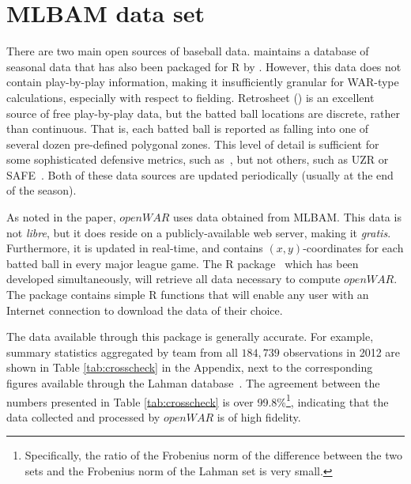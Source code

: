 \documentclass[letterpaper,titlepage]{article}
\newcommand{\R}{\textsf{R}\xspace}
\begin{document}
	

\section{MLBAM data set}
\label{apx:data}

There are two main open sources of baseball data. \cite{lahman} maintains a database of seasonal data that has also been packaged for \R by \cite{friendly}. However, this data does not contain play-by-play information, making it insufficiently granular for WAR-type calculations, especially with respect to fielding. Retrosheet (\cite{retrosheet}) is an excellent source of free play-by-play data, but the batted ball locations are discrete, rather than continuous. That is, each batted ball is reported as falling into one of several dozen pre-defined polygonal zones. This level of detail is sufficient for some sophisticated defensive metrics, such as~\cite{humphreys2011wizardry}, but not others, such as UZR or SAFE~\citep{jensen2009bayesball}. Both of these data sources are updated periodically (usually at the end of the season). 

As noted in the paper, $openWAR$ uses data obtained from MLBAM. This data is not \emph{libre}, but it does reside on a publicly-available web server, making it \emph{gratis}. Furthermore, it is updated in real-time, and contains $(x,y)$-coordinates for each batted ball in every major league game. The \R package~\citep{openWAR} which has been developed simultaneously, will retrieve all data necessary to compute $openWAR$. %
The package contains simple \R functions that will enable any user with an Internet connection to download the data of their choice. 

The data available through this package is generally accurate. For example, summary statistics aggregated by team from all $184,739$ observations in 2012 are shown in Table \ref{tab:crosscheck} in the Appendix, next to the corresponding figures available through the Lahman database~\citep{lahman}. The agreement between the numbers presented in Table \ref{tab:crosscheck} is over 99.8\%\footnote{Specifically, the ratio of the Frobenius norm of the difference between the two sets and the Frobenius norm of the Lahman set is very small.}, indicating that the data collected and processed by $openWAR$ is of high fidelity. 
\end{document}
